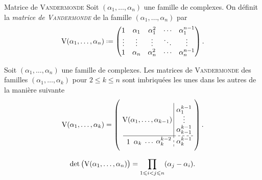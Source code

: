 \begin{defi}{Matrice de \textsc{Vandermonde}}
    Soit $(\alpha_1, \dots, \alpha_n)$ une famille de complexes. On définit la \emph{matrice de \textsc{Vandermonde}} de la famille $(\alpha_1, \dots, \alpha_n)$ par
    $$\Vandermonde(\alpha_1, \dots, \alpha_n) \defeq \begin{pmatrix}
    1 & \alpha_1 & \alpha_1^2 & \cdots & \alpha_1^{n-1} \\
    \vdots & \vdots & \vdots & \ddots & \vdots \\
    1 & \alpha_n & \alpha_n^2 & \cdots & \alpha_n^{n-1}
    \end{pmatrix}.$$
\end{defi}

\newcommand{\vandk}{
\left(\begin{gathered}
    \tikzpicture[every node/.style={anchor=south west}]
        \node[minimum width=2cm,minimum height=1.5cm] at (-0.16,0.625) {$\Vandermonde(\alpha_1, \dots, \alpha_{k-1})$};
        \node[minimum width=0.5cm,minimum height=0.5cm] at (0,0.05) {$1$};
        \node[minimum width=0.5cm,minimum height=0.5cm] at (0.4, 0) {$\alpha_{k}$};
        \node[minimum width=0.5cm,minimum height=0.5cm] at (0.95,0) {$\cdots$};
        \node[minimum width=0.5cm,minimum height=0.5cm] at (1.5,0) {$\alpha_{k}^{k-2}$};
        \node[minimum width=1cm,minimum height=0.5cm] at (2.5,0) {$\alpha_{k}^{k-1}$};
        \node[minimum width=1cm,minimum height=1cm] at (2.5,0.4) {$\alpha_{k-1}^{k-1}$};
        \node[minimum width=1cm,minimum height=1cm] at (2.5,1) {$\vdots$};
        \node[minimum width=1cm,minimum height=1cm] at (2.5,1.4) {$\alpha_1^{k-1}$};
        \draw (0,0.6) -- (2.5,0.6);
        \draw (2.5,0.6) -- (2.5,2.225);
        \draw[dashed] (2.5,0.6) -- (3.5,0.6);
        \draw[dashed] (2.5,0.6) -- (2.5,0);
    \endtikzpicture
    \end{gathered}\right)
}

\begin{remarque}
    Soit $(\alpha_1, \dots, \alpha_n)$ une famille de complexes. Les matrices de \textsc{Vandermonde} des familles $(\alpha_1, \dots, \alpha_k)$ pour $2 \leqslant k \leqslant n$ sont imbriquées les unes dans les autres de la manière suivante
    $$\Vandermonde(\alpha_1, \dots, \alpha_k) = \vandk.$$
\end{remarque}

\begin{prop}{}
    $$\det \big( \mathrm{V}(\alpha_1, \dots, \alpha_n) \big) = \prod_{1\leqslant i < j \leqslant n}(\alpha_j - \alpha_i).$$
\end{prop}

